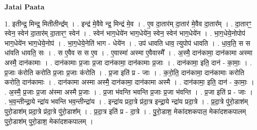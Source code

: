 \documentclass[17pt]{extarticle}
\begin{document}
\textbf{Jatai Paata} \newline

1. इतीन्द्र॒ मिन्द्र॒ मितीतीन्द्र᳚म् । . इन्द्र॑ मे॒वैवे न्द्र॒ मिन्द्र॑ मे॒व । . ए॒व दा॒तार॑म् दा॒तार॑ मे॒वैव दा॒तार᳚म् । . दा॒तारꣳ॒॒ स्वेन॒ स्वेन॑ दा॒तार॑म् दा॒तारꣳ॒॒ स्वेन॑ । . स्वेन॑ भाग॒धेये॑न भाग॒धेये॑न॒ स्वेन॒ स्वेन॑ भाग॒धेये॑न । . भा॒ग॒धेये॒नोपोप॑ भाग॒धेये॑न भाग॒धेये॒नोप॑ । . भा॒ग॒धेये॒नेति॑ भाग - धेये॑न । . उप॑ धावति धाव॒ त्युपोप॑ धावति । . धा॒व॒ति॒ स स धा॑वति धावति॒ सः । . स ए॒वैव स स ए॒व । . ए॒वास्मा॑ अस्मा ए॒वैवास्मै᳚ । . अ॒स्मै॒ दान॑कामा॒ दान॑कामा अस्मा अस्मै॒ दान॑कामाः । . दान॑कामाः प्र॒जाः प्र॒जा दान॑कामा॒ दान॑कामाः प्र॒जाः । . दान॑कामा॒ इति॒ दान॑ - का॒माः॒ । . प्र॒जाः क॑रोति करोति प्र॒जाः प्र॒जाः क॑रोति । . प्र॒जा इति॑ प्र - जाः । . क॒रो॒ति॒ दान॑कामा॒ दान॑कामाः करोति करोति॒ दान॑कामाः । . दान॑कामा अस्मा अस्मै॒ दान॑कामा॒ दान॑कामा अस्मै । . दान॑कामा॒ इति॒ दान॑ - का॒माः॒ । . अ॒स्मै॒ प्र॒जाः प्र॒जा अ॑स्मा अस्मै प्र॒जाः । . प्र॒जा भ॑वन्ति भवन्ति प्र॒जाः प्र॒जा भ॑वन्ति । . प्र॒जा इति॑ प्र - जाः । . भ॒व॒न्तीन्द्रा॒ये न्द्रा॑य भवन्ति भव॒न्तीन्द्रा॑य । . इन्द्रा॑य प्रदा॒त्रे प्र॑दा॒त्र इन्द्रा॒ये न्द्रा॑य प्रदा॒त्रे । . प्र॒दा॒त्रे पु॑रो॒डाश॑म् पुरो॒डाश॑म् प्रदा॒त्रे प्र॑दा॒त्रे पु॑रो॒डाश᳚म् । . प्र॒दा॒त्र इति॑ प्र - दा॒त्रे । . पु॒रो॒डाश॒ मेका॑दशकपाल॒ मेका॑दशकपालम् पुरो॒डाश॑म् पुरो॒डाश॒ मेका॑दशकपालम् । \newline
\end{document}
